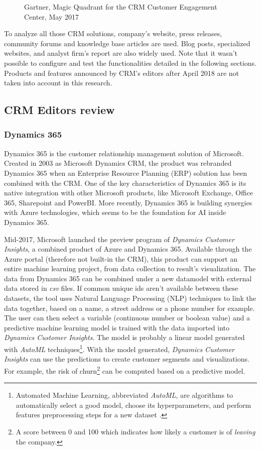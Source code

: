 \begin{figure}[!h]
\begin{minipage}[c]{0.49\linewidth}
        \caption[Magic Quadrant for the CRM Customer Engagement Center]{Gartner, Magic Quadrant for the CRM Customer Engagement Center, May 2017}
        \label{fig:magic-quadrant-customer-engagement}
    \end{minipage}
\end{figure}

To analyze all those CRM solutions, company's website, press releases, community forums and knowledge base articles are used. Blog posts, specialized websites, and analyst firm's report are also widely used. Note that it wasn't possible to configure and test the functionalities detailed in the following sections. Products and features announced by CRM's editors after April 2018 are not taken into account in this research.

\subsection{CRM Editors review}

\subsubsection*{Dynamics 365}
Dynamics 365 is the customer relationship management solution of Microsoft. Created in 2003 as Microsoft Dynamics CRM, the product was rebranded Dynamics 365 when an Enterprise Resource Planning (ERP) solution has been combined with the CRM. One of the key characteristics of Dynamics 365 is its native integration with other Microsoft products, like Microsoft Exchange, Office 365, Sharepoint and PowerBI. More recently, Dynamics 365 is building synergies with Azure technologies, which seems to be the foundation for AI inside Dynamics 365. 

Mid-2017, Microsoft launched the preview program of \textit{Dynamics Customer Insights}, a combined product of Azure and Dynamics 365. Available through the Azure portal (therefore not built-in the CRM), this product can support an entire machine learning project, from data collection to result's visualization. The data from Dynamics 365 can be combined under a new datamodel with external data stored in \textit{csv} files. If common unique ids aren't available between these datasets, the tool uses Natural Language Processing (NLP) techniques to link the data together, based on a name, a street address or a phone number for example. The user can then select a variable (continuous number or boolean value) and a predictive machine learning model is trained with the data imported into \textit{Dynamics Customer Insights}. The model is probably a linear model generated with \textit{AutoML} techniques\footnote{Automated Machine Learning, abbreviated \textit{AutoML}, are algorithms to automatically select a good model, choose its hyperparameters, and perform features preprocessing steps for a new dataset \cite{NIPS2015_5872}.}. With the model generated, \textit{Dynamics Customer Insights} can use the predictions to create customer segments and visualizations. For example, the risk of churn\footnote{A score between 0 and 100 which indicates how likely a customer is of \textit{leaving} the company.} can be computed based on a predictive model.

